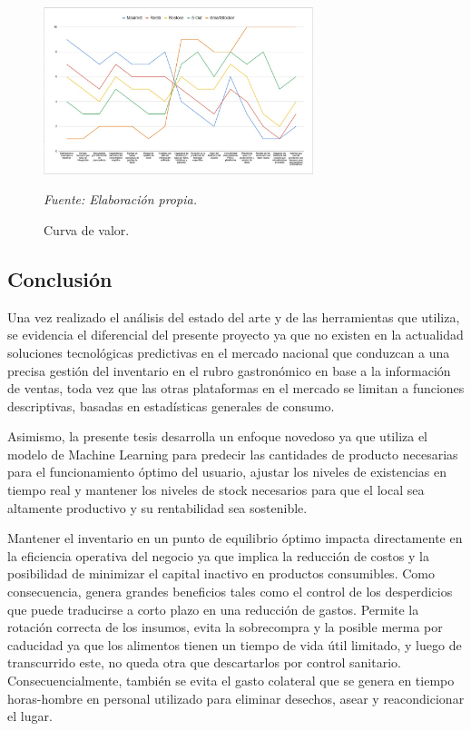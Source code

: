 \begin{figure}[htbp]
    \centering
    \includegraphics[width=0.7\textwidth]{images/curvaValor.jpeg}
    \caption{Curva de valor.}
    {\textit{Fuente: Elaboración propia.}}
    \label{fig:curva}
\end{figure}

\FloatBarrier

\subsection{Conclusión}\label{sec:sintesis-estado}

Una vez realizado el análisis del estado del arte y de las herramientas que utiliza, se evidencia el diferencial del presente proyecto ya que no existen en la actualidad soluciones tecnológicas predictivas en el mercado nacional que conduzcan a una precisa gestión del inventario en el rubro gastronómico en base a la información de ventas, toda vez que las otras plataformas en el mercado se limitan a funciones descriptivas, basadas en estadísticas generales de consumo.

Asimismo, la presente tesis desarrolla un enfoque novedoso ya que utiliza el modelo de Machine Learning para predecir las cantidades de producto necesarias para el funcionamiento óptimo del usuario, ajustar los niveles de existencias en tiempo real y mantener los niveles de stock necesarios para que el local sea altamente productivo y su rentabilidad sea sostenible.

Mantener el inventario en un punto de equilibrio óptimo impacta directamente en la eficiencia operativa del negocio ya que implica la reducción de costos y la posibilidad de minimizar el capital inactivo en productos consumibles. Como consecuencia, genera grandes beneficios tales como el control de los desperdicios que puede traducirse a corto plazo en una reducción de gastos. Permite la rotación correcta de los insumos, evita la sobrecompra y la posible merma por caducidad ya que los alimentos tienen un tiempo de vida útil limitado, y luego de transcurrido este, no queda otra que descartarlos por control sanitario. Consecuencialmente, también se evita el gasto colateral que se genera en tiempo horas-hombre en personal utilizado para eliminar desechos, asear y reacondicionar el lugar.

